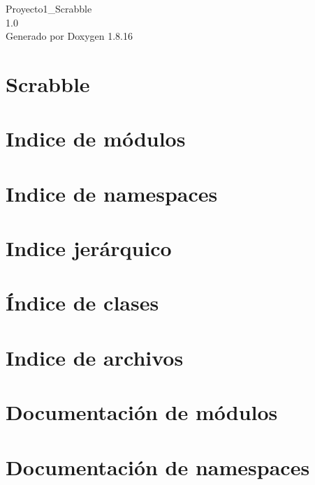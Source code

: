 \let\mypdfximage\pdfximage\def\pdfximage{\immediate\mypdfximage}\documentclass[twoside]{book}
\newcommand{\+}{\discretionary{\mbox{\scriptsize$\hookleftarrow$}}{}{}}
\newcommand{\clearemptydoublepage}{%
  \newpage{\pagestyle{empty}\cleardoublepage}%
}
\begin{document}
\hypersetup{pageanchor=false,
             bookmarksnumbered=true,
             pdfencoding=unicode
            }
\begin{titlepage}
\vspace*{7cm}
\begin{center}%
{\Large Proyecto1\+\_\+\+Scrabble \\[1ex]\large 1.\+0 }\\
\vspace*{1cm}
{\large Generado por Doxygen 1.8.16}\\
\end{center}
\end{titlepage}
\clearemptydoublepage
{}
\tableofcontents
\clearemptydoublepage
{}
\hypersetup{pageanchor=true}

\chapter{Scrabble}
\label{md__r_e_a_d_m_e}

\chapter{Indice de módulos}

\chapter{Indice de namespaces}

\chapter{Indice jerárquico}

\chapter{Índice de clases}

\chapter{Indice de archivos}

\chapter{Documentación de módulos}


\chapter{Documentación de namespaces}



\end{document}
